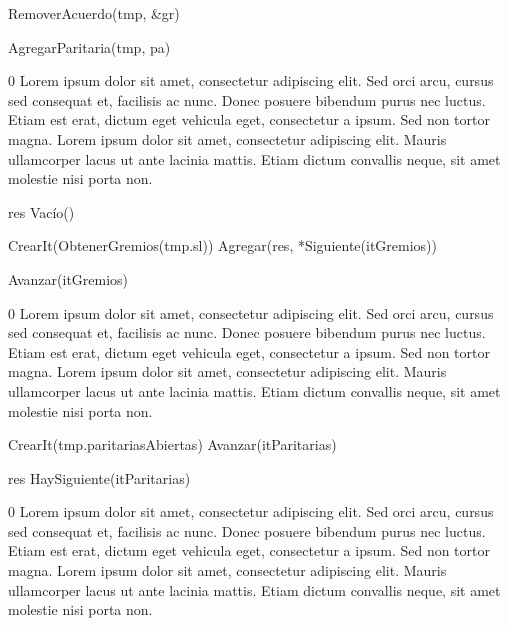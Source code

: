 {
	\state {} \asig RemoverAcuerdo(tmp, \&gr)			

	\state AgregarParitaria(tmp, pa)											
}
{0}
{Lorem ipsum dolor sit amet, consectetur adipiscing elit. Sed orci arcu, cursus sed consequat et, facilisis ac nunc. Donec posuere bibendum purus nec luctus. Etiam est erat, dictum eget vehicula eget, consectetur a ipsum. Sed non tortor magna. Lorem ipsum dolor sit amet, consectetur adipiscing elit. Mauris ullamcorper lacus ut ante lacinia mattis. Etiam dictum convallis neque, sit amet molestie nisi porta non.}

{
	\state res \asig Vacío()								

	\state
	\state {} \asig CrearIt(ObtenerGremios(tmp.sl))						
					
		\state
		\state Agregar(res, *Siguiente(itGremios))			

		\state
		\state Avanzar(itGremios)						
	\endwhile
}
{0}
{Lorem ipsum dolor sit amet, consectetur adipiscing elit. Sed orci arcu, cursus sed consequat et, facilisis ac nunc. Donec posuere bibendum purus nec luctus. Etiam est erat, dictum eget vehicula eget, consectetur a ipsum. Sed non tortor magna. Lorem ipsum dolor sit amet, consectetur adipiscing elit. Mauris ullamcorper lacus ut ante lacinia mattis. Etiam dictum convallis neque, sit amet molestie nisi porta non.}

{
	\state {} \asig CrearIt(tmp.paritariasAbiertas)		
			
		\state
		\state Avanzar(itParitarias)				
	\endwhile
	\state

	\state res \asig HaySiguiente(itParitarias)		
}
{0}
{Lorem ipsum dolor sit amet, consectetur adipiscing elit. Sed orci arcu, cursus sed consequat et, facilisis ac nunc. Donec posuere bibendum purus nec luctus. Etiam est erat, dictum eget vehicula eget, consectetur a ipsum. Sed non tortor magna. Lorem ipsum dolor sit amet, consectetur adipiscing elit. Mauris ullamcorper lacus ut ante lacinia mattis. Etiam dictum convallis neque, sit amet molestie nisi porta non.}

